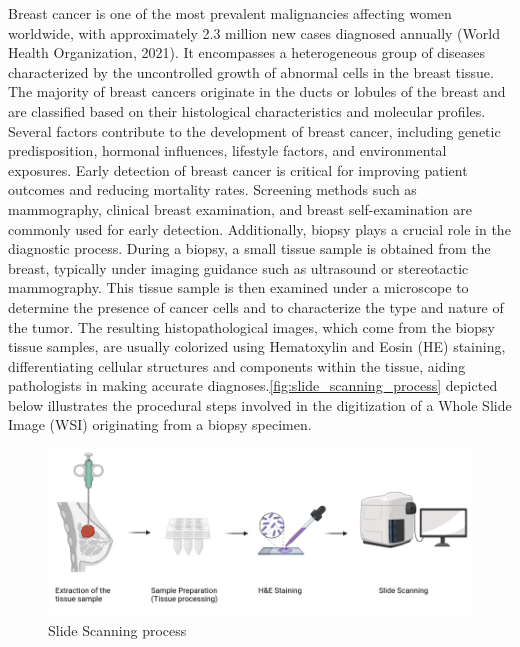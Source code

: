 \documentclass[
11pt, %
english, %
singlespacing, %
headsepline, %
]{project_structure}
\begin{document}
Breast cancer is one of the most prevalent malignancies affecting women worldwide, with approximately 2.3 million new cases diagnosed annually (World Health Organization, 2021). It encompasses a heterogeneous group of diseases characterized by the uncontrolled growth of abnormal cells in the breast tissue. The majority of breast cancers originate in the ducts or lobules of the breast and are classified based on their histological characteristics and molecular profiles.
Several factors contribute to the development of breast cancer, including genetic predisposition, hormonal influences, lifestyle factors, and environmental exposures.
Early detection of breast cancer is critical for improving patient outcomes and reducing mortality rates. Screening methods such as mammography, clinical breast examination, and breast self-examination are commonly used for early detection. Additionally, biopsy plays a crucial role in the diagnostic process. During a biopsy, a small tissue sample is obtained from the breast, typically under imaging guidance such as ultrasound or stereotactic mammography. This tissue sample is then examined under a microscope to determine the presence of cancer cells and to characterize the type and nature of the tumor. The resulting histopathological images, which come from the biopsy tissue samples, are usually colorized using Hematoxylin and Eosin (\acrshort{HE}) staining, differentiating cellular structures and components within the tissue, aiding pathologists in making accurate diagnoses.\autoref{fig:slide_scanning_process} depicted below illustrates the procedural steps involved in the digitization of a Whole Slide Image (WSI) originating from a biopsy specimen.

\begin{figure}[H]
    \centering
    \includegraphics[width=\textwidth]{figures/slide_scanning_process.png}
    \caption{Slide Scanning process}
    \label{fig:slide_scanning_process}
\end{figure}
\end{document}
